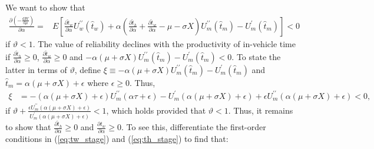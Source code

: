 \documentclass[12pt,a4paper,british]{article}
\makeatletter
\newenvironment{proof}[1][\proofname]{\par
    \normalfont\topsep6\p@\@plus6\p@\relax
    \trivlist
    \itemindent\parindent
    \item[\hskip\labelsep
          \scshape
      #1]\ignorespaces
  }{%
    \endtrivlist\@endpefalse
  }
\providecommand{\proofname}{Proof}
\makeatother
\begin{document}
\begin{proof}
We want to show that 
\begin{align*}
\frac{\partial\left(-\frac{\mathrm{d}W}{\mathrm{d}\mu}\right)}{\partial\alpha}= & E\left[\frac{\partial\hat{t}_{w}}{\partial\alpha}U_{w}^{\prime\prime}\left(\hat{t}_{w}\right)+\alpha\left(\frac{\partial\hat{t}_{h}}{\partial\alpha}+\frac{\partial\hat{t}_{w}}{\partial\alpha}-\mu-\sigma X\right)U_{m}^{\prime\prime}\left(\hat{t}_{m}\right)-U_{m}^{\prime}\left(\hat{t}_{m}\right)\right]<0
\end{align*}
if $\vartheta<1$. The value of reliability declines with the productivity
of in-vehicle time if $\frac{\partial\hat{t}_{h}}{\partial\alpha}\geq0$,
$\frac{\partial\hat{t}_{w}}{\partial\alpha}\geq0$ and $-\alpha\left(\mu+\sigma X\right)U_{m}^{\prime\prime}\left(\hat{t}_{m}\right)-U_{m}^{\prime}\left(\hat{t}_{m}\right)<0$.
To state the latter in terms of $\vartheta$, define $\xi\equiv-\alpha\left(\mu+\sigma X\right)U_{m}^{\prime\prime}\left(\hat{t}_{m}\right)-U_{m}^{\prime}\left(\hat{t}_{m}\right)$
and $\hat{t}_{m}=\alpha\left(\mu+\sigma X\right)+\epsilon$ where
$\epsilon\geq0$. Thus,
\begin{align*}
\xi & =-\left(\alpha\left(\mu+\sigma X\right)+\epsilon\right)U_{m}^{\prime\prime}\left(\alpha\tau+\epsilon\right)-U_{m}^{\prime}\left(\alpha\left(\mu+\sigma X\right)+\epsilon\right)+\epsilon U_{m}^{\prime\prime}\left(\alpha\left(\mu+\sigma X\right)+\epsilon\right)<0,
\end{align*}
if $\vartheta+\frac{\epsilon U_{m}^{\prime\prime}\left(\alpha\left(\mu+\sigma X\right)+\epsilon\right)}{U_{m}^{\prime}\left(\alpha\left(\mu+\sigma X\right)+\epsilon\right)}<1$,
which holds provided that $\vartheta<1$. Thus, it remains to show
that $\frac{\partial\hat{t}_{h}}{\partial\alpha}\geq0$ and $\frac{\partial\hat{t}_{w}}{\partial\alpha}\geq0$.
To see this, differentiate the first-order conditions in (\ref{eq:tw_stage})
and (\ref{eq:th_stage}) to find that:


\end{proof}
\end{document}
